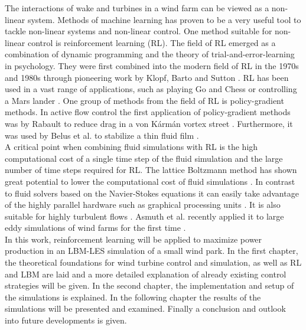 The interactions of wake and turbines in a wind farm can be viewed as a non-linear system. Methods of machine learning has proven to be a very useful tool to tackle non-linear systems and non-linear control. One method suitable for non-linear control is reinforcement learning (RL). The field of RL emerged as a combination  of dynamic programming and the theory of trial-and-error-learning in psychology. They were first combined into the modern field of RL in the 1970s and 1980s through pioneering work by Klopf, Barto and Sutton \cite[p. 20-21]{sutton_reinforcement_2018}. RL has been used in a vast range of applications, such as playing Go and Chess \cite{silver_general_2018} or controlling a Mars lander  \cite{gaudet_deep_2020}. One group of methods from the field of RL is policy-gradient methods. In active flow control the first application of policy-gradient methods was by Rabault to reduce drag in a von Kármán vortex street \cite{rabault_artificial_2019}. Furthermore, it was used by Belus et al. to stabilize a thin fluid film \cite{belus_exploiting_2019}.  \\
A critical point when combining fluid simulations with RL is the high computational cost of a single time step of the fluid simulation and the large number of time steps required for RL. The lattice Boltzmann method has shown great potential to lower the computational cost of fluid simulations \cite{lohner_towards_2019}. In contrast to fluid solvers based on the Navier-Stokes equations it can easily take advantage of the highly parallel hardware such as graphical processing units \cite{kutscher_multiscale_2019}. It is also suitable for highly turbulent flows \cite{gehrke_scrutinizing_2017}. Asmuth et al. recently applied it to large eddy simulations of wind farms for the first time \cite{asmuth_actuator_2019}.\\
In this work, reinforcement learning will be applied to maximize power production in an LBM-LES simulation of a small wind park. In the first chapter, the theoretical foundations for wind turbine control and simulation, as well as RL and LBM are laid and a more detailed explanation of already existing control strategies will be given. In the second chapter, the implementation and setup of the simulations is explained. In the following chapter the results of the simulations will be presented and examined. Finally a conclusion and outlook into future developments is given.